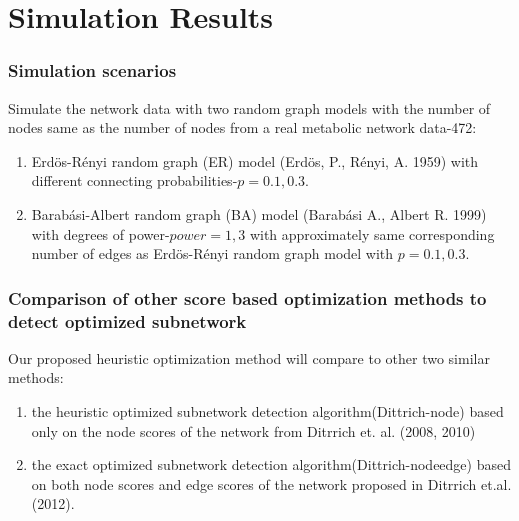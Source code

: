 \documentclass[10pt]{beamer}
\newcommand{\bn}{\begin{enumerate}}
\newcommand{\en}{\end{enumerate}}
\begin{document}
\section{Simulation Results}

\begin{frame}[fragile]
  \frametitle{Simulation scenarios}
  \vspace{-2ex}
Simulate the network data with two random graph models with the number of nodes same as the number of nodes from a real metabolic network data-472:
  \bn
  \item<1->
  Erd\"{o}s-R\'{e}nyi random graph (ER) model (Erd\"{o}s, P., R\'{e}nyi, A. 1959) with different connecting probabilities-$p=0.1,0.3$.
  \vspace{2ex} 
   \item<2-> Barab\'{a}si-Albert random graph (BA) model (Barab\'{a}si A., Albert R. 1999) with degrees of power-$power=1,3$ with approximately same corresponding number of edges as Erd\"{o}s-R\'{e}nyi random graph model with $p=0.1,0.3$. 
	\en
\end{frame}
	
\begin{frame}[fragile]
	\frametitle{Comparison of other score based optimization methods to detect optimized subnetwork}
	\vspace{-2ex}
	Our proposed heuristic optimization method will compare to other two similar methods:
		\vspace{1ex}
		\bn
		\item<1->
the heuristic optimized subnetwork detection algorithm(Dittrich-node) based only on the node scores of the network from  Ditrrich et. al. (2008, 2010)
	\vspace{2ex} 
	\item<2->the exact optimized subnetwork detection algorithm(Dittrich-nodeedge) based on both node scores and edge scores of the network proposed in Ditrrich et.al. (2012). 
	\en
\end{frame}	
	
\end{document}
